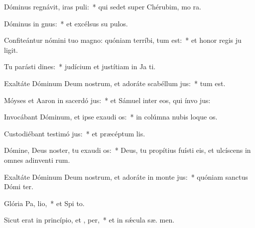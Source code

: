 \item Dóminus regnávit, iras puli:~* qui sedet super Chérubim, mo ra.
\item Dóminus in  gnus:~* et excélsus su  pulos.
\item Confiteántur nómini tuo magno: quóniam terríbi,  tum est:~* et honor regis ju ligit.
\item Tu parásti dines:~* judícium et justítiam in Ja  ti.
\item Exaltáte Dóminum Deum nostrum, et adoráte scabéllum  jus:~*  tum est.
\item Móyses et Aaron in sacerdó jus:~* et Sámuel inter eos, qui ínvo  jus:
\item Invocábant Dóminum, et ipse exaudi os:~* in colúmna nubis loque  os.
\item Custodiébant testimó jus:~* et præcéptum   lis.
\item Dómine, Deus noster, tu exaudi os:~* Deus, tu propítius fuísti eis, et ulcíscens in omnes adinventi rum.
\item Exaltáte Dóminum Deum nostrum, et adoráte in monte  jus:~* quóniam sanctus Dómi  ter.
\item Glória Pa,  lio,~* et Spi to.
\item Sicut erat in princípio, et ,  per,~* et in sǽcula sæ. men.
